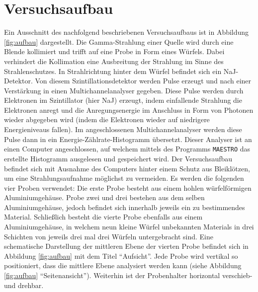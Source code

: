 \newpage
\section{Versuchsaufbau}
\label{sec:Aufbau}

Ein Ausschnitt des nachfolgend beschriebenen Versuchsaufbaus
ist in Abbildung \ref{fig:aufbau} dargestellt.
Die Gamma-Strahlung einer 
Quelle wird durch eine Blende kollimiert und trifft auf eine Probe in Form
eines Würfels.
Dabei verhindert die Kollimation eine Ausbreitung der Strahlung im Sinne
des Strahlenschutzes.
In Strahlrichtung hinter dem Würfel befindet sich ein NaJ-Detektor.
Von diesem Szintillationsdetektor werden Pulse erzeugt
und nach einer Verstärkung in einen Multichannelanalyser gegeben.
Diese Pulse werden durch Elektronen im Szintillator (hier NaJ) erzeugt,
indem einfallende Strahlung die Elektronen anregt und die Anregungsenergie
im Anschluss in Form von Photonen wieder abgegeben wird (indem die Elektronen
wieder auf niedrigere Energieniveaus fallen).
Im angeschlossenen Multichannelanalyser werden diese Pulse dann in ein
Energie-Zählrate-Histogramm übersetzt.
Dieser Analyser ist an einen Computer angeschlossen,
auf welchem mittels des Programms \texttt{MAESTRO}
das erstellte Histogramm ausgelesen und gespeichert wird.
Der Versuchsaufbau befindet sich mit Ausnahme des Computers hinter einem
Schutz aus Bleiklötzen, um eine Strahlungsaufnahme möglichst zu vermeiden.
Es werden die folgenden vier Proben verwendet:
Die erste Probe besteht aus einem hohlen würfelförmigen Aluminiumgehäuse.
Probe zwei und drei bestehen aus dem selben Aluminiumgehäuse, jedoch befindet
sich innerhalb jeweils ein zu bestimmendes Material.
Schließlich besteht die vierte Probe ebenfalls aus einem Aluminiumgehäuse,
in welchem neun kleine Würfel unbekannten Materials in drei Schichten
von jeweils drei mal drei Würfeln untergebracht sind.
Eine schematische Darstellung der mittleren Ebene der vierten Probe befindet sich
in Abbildung \ref{fig:aufbau} mit dem Titel \enquote{Aufsicht}.
Jede Probe wird vertikal so positioniert, dass die mittlere Ebene analysiert
werden kann (siehe Abbildung \ref{fig:aufbau} \enquote{Seitenansicht}).
Weiterhin ist der Probenhalter horizontal verschieb- und drehbar.

